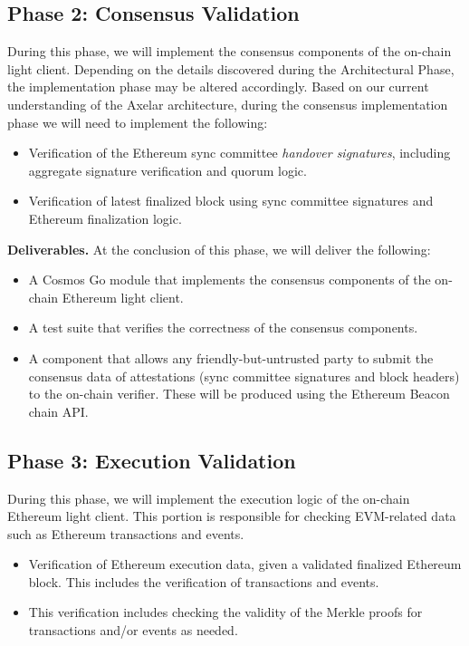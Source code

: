 \subsection{Phase 2: Consensus Validation}

During this phase, we will implement the consensus components of the on-chain light client. Depending on the details discovered during the Architectural Phase, the implementation phase may be altered accordingly. Based on our current understanding of the Axelar architecture, during the consensus implementation phase we will need to implement the following:

\begin{itemize}
  \item Verification of the Ethereum sync committee \emph{handover signatures}, including aggregate signature verification and quorum logic.
  \item Verification of latest finalized block using sync committee signatures and Ethereum finalization logic.
\end{itemize}

\noindent
\textbf{Deliverables.} At the conclusion of this phase, we will deliver the following:

\begin{itemize}
  \item A Cosmos Go module that implements the consensus components of the on-chain Ethereum light client.
  \item A test suite that verifies the correctness of the consensus components.
  \item A component that allows any friendly-but-untrusted party to submit the consensus data of attestations (sync committee signatures and block headers) to the on-chain verifier. These will be produced using the Ethereum Beacon chain API.
\end{itemize}

\subsection{Phase 3: Execution Validation}

During this phase, we will implement the execution logic of the on-chain Ethereum light client. This portion is responsible for checking EVM-related data such as Ethereum transactions and events.

\begin{itemize}
  \item Verification of Ethereum execution data, given a validated finalized Ethereum block. This includes the verification of transactions and events.
  \item This verification includes checking the validity of the Merkle proofs for transactions and/or events as needed.
\end{itemize}

